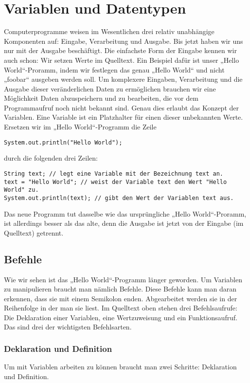 \chapter{Variablen und Datentypen}
Computerprogramme weisen im Wesentlichen drei relativ unabhängige Komponenten auf: Eingabe, Verarbeitung und Ausgabe. Bis jetzt haben wir uns nur mit der Ausgabe beschäftigt.
Die einfachste Form der Eingabe kennen wir auch schon: Wir setzen Werte im Quelltext. Ein Beispiel dafür ist unser „Hello World“-Proramm, indem wir festlegen das genau „Hello World“ und nicht „foobar“ ausgeben werden soll.
Um komplexere Eingaben, Verarbeitung und die Ausgabe dieser veränderlichen Daten zu ermöglichen brauchen wir eine Möglichkeit Daten abzuspeichern und zu bearbeiten, die vor dem Programmaufruf noch nicht bekannt sind.
Genau dies erlaubt das Konzept der Variablen. Eine Variable ist ein Platzhalter für einen dieser unbekannten Werte. \\

Ersetzen wir im „Hello World“-Programm die Zeile
\begin{lstlisting}
System.out.println("Hello World");
\end{lstlisting}
durch die folgenden drei Zeilen:
\begin{lstlisting}
String text; // legt eine Variable mit der Bezeichnung text an.
text = "Hello World"; // weist der Variable text den Wert "Hello World" zu.
System.out.println(text); // gibt den Wert der Variablen text aus.
\end{lstlisting}

Das neue Programm tut dasselbe wie das ursprüngliche „Hello World“-Proramm, ist allerdings besser als das alte, denn die Ausgabe ist jetzt von der Eingabe (im Quelltext) getrennt.

\section {Befehle}
Wie wir sehen ist das „Hello World“-Programm länger geworden. Um Variablen zu manipulieren braucht man nämlich Befehle. Diese Befehle kann man daran erkennen, dass sie mit einem Semikolon enden. Abgearbeitet werden sie in der Reihenfolge in der man sie liest. Im Quelltext oben stehen drei Befehlsaufrufe:
Die Deklaration einer Variablen, eine Wertzuweisung und ein Funktionsaufruf. Das sind drei der wichtigsten Befehlsarten.

\subsection {Deklaration und Definition}
Um mit Variablen arbeiten zu können braucht man zwei Schritte: Deklaration und Definition.

